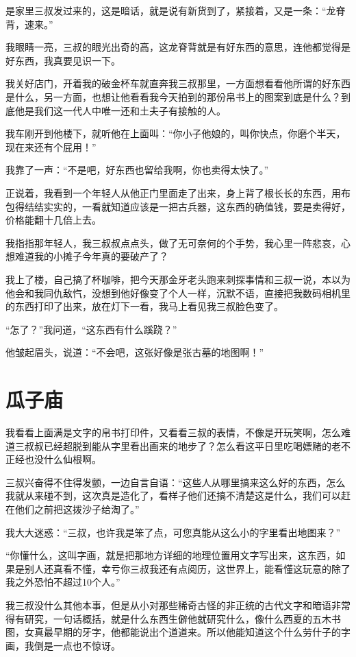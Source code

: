 是家里三叔发过来的，这是暗话，就是说有新货到了，紧接着，又是一条：“龙脊背，速来。”

我眼睛一亮，三叔的眼光出奇的高，这龙脊背就是有好东西的意思，连他都觉得是好东西，我真要见识一下。

我关好店门，开着我的破金杯车就直奔我三叔那里，一方面想看看他所谓的好东西是什么，另一方面，也想让他看看我今天拍到的那份帛书上的图案到底是什么？到底他是我们这一代人中唯一还和土夫子有接触的人。

我车刚开到他楼下，就听他在上面叫：“你小子他娘的，叫你快点，你磨个半天，现在来还有个屁用！”

我靠了一声：“不是吧，好东西也留给我啊，你也卖得太快了。”

正说着，我看到一个年轻人从他正门里面走了出来，身上背了根长长的东西，用布包得结结实实的，一看就知道应该是一把古兵器，这东西的确值钱，要是卖得好，价格能翻十几倍上去。

我指指那年轻人，我三叔叔点点头，做了无可奈何的个手势，我心里一阵悲哀，心想难道我的小摊子今年真的要破产了？

我上了楼，自己搞了杯咖啡，把今天那金牙老头跑来刺探事情和三叔一说，本以为他会和我同仇敌忾，没想到他好像变了个人一样，沉默不语，直接把我数码相机里的东西打印了出来，放在灯下一看，我马上看见我三叔脸色变了。

“怎了？”我问道，“这东西有什么蹊跷？”

他皱起眉头，说道：“不会吧，这张好像是张古墓的地图啊！”

\chapter{瓜子庙}

我看看上面满是文字的帛书打印件，又看看三叔的表情，不像是开玩笑啊，怎么难道三叔叔已经超脱到能从字里看出画来的地步了？怎么看这平日里吃喝嫖赌的老不正经也没什么仙根啊。

三叔兴奋得不住得发颤，一边自言自语：“这些人从哪里搞来这么好的东西，怎么我就从来碰不到，这次真是造化了，看样子他们还搞不清楚这是什么，我们可以赶在他们之前把这拨沙子给淘了。”

我大大迷惑：“三叔，也许我是笨了点，可您真能从这么小的字里看出地图来？”

“你懂什么，这叫字画，就是把那地方详细的地理位置用文字写出来，这东西，如果是别人还真看不懂，幸亏你三叔我还有点阅历，这世界上，能看懂这玩意的除了我之外恐怕不超过10个人。”

我三叔没什么其他本事，但是从小对那些稀奇古怪的非正统的古代文字和暗语非常得有研究，一句话概括，就是什么东西生僻他就研究什么，像什么西夏的五木书图，女真最早期的牙字，他都能说出个道道来。所以他能知道这个什么劳什子的字画，我倒是一点也不惊讶。

